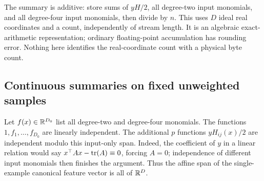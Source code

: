 The summary is additive: store sums of $yH/2$, all degree-two input
monomials, and all degree-four input monomials, then divide by $n$.
This uses $D$ ideal real coordinates and a count, independently of stream
length. It is an algebraic exact-arithmetic representation; ordinary
floating-point accumulation has rounding error. Nothing here identifies
the real-coordinate count with a physical byte count.

\subsection{Continuous summaries on fixed unweighted samples}

Let $f(x)\in\mathbb R^{D_0}$ list all degree-two and degree-four monomials.
The functions $1,f_1,\ldots,f_{D_0}$ are linearly independent. The
additional $p$ functions $yH_{ij}(x)/2$ are independent modulo this
input-only span. Indeed, the coefficient of $y$ in a linear relation
would say $x^\top Ax-\operatorname{tr}(A)\equiv0$, forcing $A=0$; independence of
different input monomials then finishes the argument. Thus the affine
span of the single-example canonical feature vector is all of $\mathbb R^D$.

